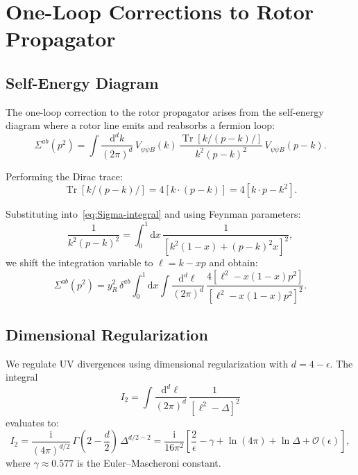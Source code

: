 \documentclass[11pt,a4paper]{article}
\numberwithin{equation}{section}
\theoremstyle{plain}
\theoremstyle{definition}
\theoremstyle{remark}
\DeclareMathOperator{\Tr}{Tr}
\newcommand{\dd}{\mathrm{d}}
\newcommand{\ii}{\mathrm{i}}
\begin{document}
\vspace{1em}

\section{One-Loop Corrections to Rotor Propagator}\label{sec:oneloop}

\subsection{Self-Energy Diagram}

The one-loop correction to the rotor propagator arises from the self-energy diagram where a rotor line emits and reabsorbs a fermion loop:
\begin{equation}
\Sigma^{ab}(p^2) = \int \frac{\dd^d k}{(2\pi)^d}\,V_{\psi\bar\psi B}(k)\,\frac{\Tr[k\!\!\!/(p-k)\!\!\!/]}{k^2(p-k)^2}\,V_{\psi\bar\psi B}(p-k).
\label{eq:Sigma-integral}
\end{equation}

Performing the Dirac trace:
\begin{equation}
\Tr[k\!\!\!/(p-k)\!\!\!/] = 4[k\cdot(p-k)] = 4[k\cdot p - k^2].
\label{eq:trace-dirac}
\end{equation}

Substituting into~\eqref{eq:Sigma-integral} and using Feynman parameters:
\begin{equation}
\frac{1}{k^2(p-k)^2} = \int_0^1 \dd x\,\frac{1}{[k^2(1-x)+(p-k)^2 x]^2},
\label{eq:feynman-param}
\end{equation}
we shift the integration variable to $\ell = k - xp$ and obtain:
\begin{equation}
\Sigma^{ab}(p^2) = y_R^2\,\delta^{ab}\int_0^1 \dd x\int \frac{\dd^d \ell}{(2\pi)^d}\,\frac{4[\ell^2 - x(1-x)p^2]}{[\ell^2 - x(1-x)p^2]^2}.
\label{eq:Sigma-feynman}
\end{equation}

\subsection{Dimensional Regularization}

We regulate UV divergences using dimensional regularization with $d=4-\epsilon$. The integral
\begin{equation}
I_2 = \int \frac{\dd^d \ell}{(2\pi)^d}\,\frac{1}{[\ell^2-\Delta]^2}
\label{eq:I2}
\end{equation}
evaluates to:
\begin{equation}
I_2 = \frac{\ii}{(4\pi)^{d/2}}\,\Gamma\left(2-\frac{d}{2}\right)\,\Delta^{d/2-2} = \frac{\ii}{16\pi^2}\left[\frac{2}{\epsilon} - \gamma + \ln(4\pi) + \ln\Delta + \mathcal{O}(\epsilon)\right],
\label{eq:I2-result}
\end{equation}
where $\gamma\approx 0.577$ is the Euler--Mascheroni constant.
\end{document}
